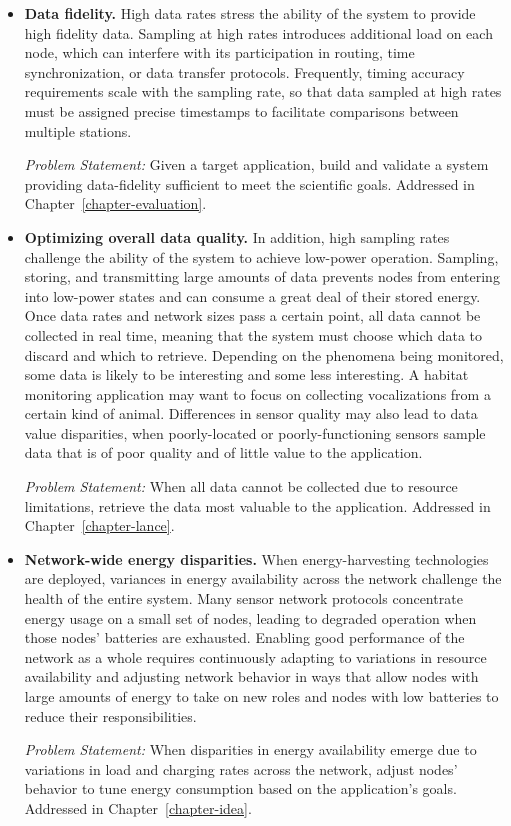 \begin{itemize}

\item \textbf{Data fidelity.} High data rates stress the ability of the
system to provide high fidelity data. Sampling at high rates introduces
additional load on each node, which can interfere with its participation in
routing, time synchronization, or data transfer protocols. Frequently, timing
accuracy requirements scale with the sampling rate, so that data sampled at
high rates must be assigned precise timestamps to facilitate comparisons
between multiple stations.

\textit{Problem Statement:} Given a target application, build and validate a
system providing data-fidelity sufficient to meet the scientific goals.
Addressed in Chapter~\ref{chapter-evaluation}.

\item \textbf{Optimizing overall data quality.} In addition, high sampling
rates challenge the ability of the system to achieve low-power operation.
Sampling, storing, and transmitting large amounts of data prevents nodes from
entering into low-power states and can consume a great deal of their stored
energy. Once data rates and network sizes pass a certain point, all data
cannot be collected in real time, meaning that the system must choose which
data to discard and which to retrieve. Depending on the phenomena being
monitored, some data is likely to be interesting and some less interesting. A
habitat monitoring application may want to focus on collecting vocalizations
from a certain kind of animal. Differences in sensor quality may also lead to
data value disparities, when poorly-located or poorly-functioning sensors
sample data that is of poor quality and of little value to the application.

\textit{Problem Statement:} When all data cannot be collected due to resource
limitations, retrieve the data most valuable to the application. Addressed in
Chapter~\ref{chapter-lance}.

\item \textbf{Network-wide energy disparities.} When energy-harvesting
technologies are deployed, variances in energy availability across the
network challenge the health of the entire system. Many sensor network
protocols concentrate energy usage on a small set of nodes, leading to
degraded operation when those nodes' batteries are exhausted. Enabling good
performance of the network as a whole requires continuously adapting to
variations in resource availability and adjusting network behavior in ways
that allow nodes with large amounts of energy to take on new roles and nodes
with low batteries to reduce their responsibilities.

\textit{Problem Statement:} When disparities in energy availability emerge
due to variations in load and charging rates across the network, adjust
nodes' behavior to tune energy consumption based on the application's goals.
Addressed in Chapter~\ref{chapter-idea}.

\end{itemize}

